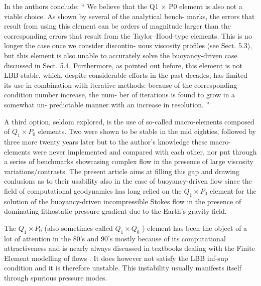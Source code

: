\documentclass[a4paper]{article}
\begin{document}
In \cite{thba22} the authors conclude:
``
We believe that the Q1 × P0 element is also not a viable
choice. As shown by several of the analytical bench-
marks, the errors that result from using this element can
be orders of magnitude larger than the corresponding
errors that result from the Taylor–Hood-type elements.
This is no longer the case once we consider discontin-
uous viscosity profiles (see Sect. 5.3), but this element
is also unable to accurately solve the buoyancy-driven
case discussed in Sect. 5.4. Furthermore, as pointed out
before, this element is not LBB-stable, which, despite
considerable efforts in the past decades, has limited its
use in combination with iterative methods: because of
the corresponding condition number increase, the num-
ber of iterations is found to grow in a somewhat un-
predictable manner with an increase in resolution. ''

A third option, seldom explored, is the use of so-called macro-elements composed of $Q_1\times P_0$ elements. 
Two were shown to be stable in the mid eighties\cite{leta81,sten84}, followed by three more twenty years
later\cite{qizh07} but to the author's knowledge these macro-elements were never 
implemented and compared with each other, nor put through a series of benchmarks showcasing complex flow in the 
presence of large viscosity variations/contrasts. The present article aims at 
filling this gap and drawing conlusions as to their usability also in the case of buoyancy-driven flow
since the field of computational geodynamics has long relied on the $Q_1\times P_0$ element for the 
solution of the buoyancy-driven incompressible Stokes flow in the presence of 
dominating lithostatic pressure gradient due to the Earth's gravity field.  




The $Q_1\times P_0$ (also sometimes called 
$Q_1 \times Q_0$ \cite{grsa}) element has been the object of a lot of attention in the 80's and 90's
mostly because of its computational attractiveness and is nearly always discussed in 
textbooks dealing with the Finite Element modelling of flows \cite{grsa,dohu03,bobf08,bobf13}.
It does however not satisfy the LBB inf-sup condition and it is therefore unstable. 
This instability usually manifests itself through spurious pressure modes.
\end{document}

